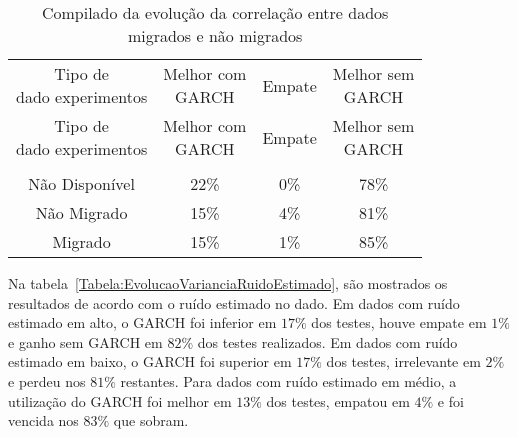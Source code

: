  \begin{center}
\begin{longtable}{cccc}
\toprule
\rowcolor{white}
 \caption{Compilado da evolução da correlação entre dados migrados e não
 migrados} \label{Tabela:EvolucaoVarianciaMigradoNaoMigrado} \\
\midrule
\rowcolor{white}
   \specialcell{Tipo de\\dado experimentos} & \specialcell{Melhor com\\GARCH} &
   Empate & \specialcell{Melhor sem\\GARCH} \\
\midrule
\endfirsthead
\midrule
\rowcolor{white}
   \specialcell{Tipo de\\dado experimentos} & \specialcell{Melhor com\\GARCH} &
   Empate & \specialcell{Melhor sem\\GARCH} \\
\toprule
\endhead
\midrule \\ %
\endfoot
\bottomrule
\endlastfoot
    Não Disponível & 22\%  & 0\%   & 78\% \\
    Não Migrado & 15\%  & 4\%   & 81\% \\
    Migrado   & 15\%  & 1\%   & 85\% \\
\end{longtable}
\end{center}

Na tabela~\ref{Tabela:EvolucaoVarianciaRuidoEstimado}, são mostrados os
resultados de acordo com o ruído estimado no dado. Em dados com ruído estimado em alto, o
GARCH foi inferior em $17\%$ dos testes, houve empate em $1\%$ e ganho sem GARCH
em $82\%$ dos testes realizados. Em dados com ruído estimado em baixo, o GARCH
foi superior em $17\%$ dos testes, irrelevante em $2\%$ e perdeu nos $81\%$
restantes. Para dados com ruído estimado em médio, a utilização do GARCH
foi melhor em $13\%$ dos testes, empatou em $4\%$ e foi vencida nos $83\%$ que
sobram.

